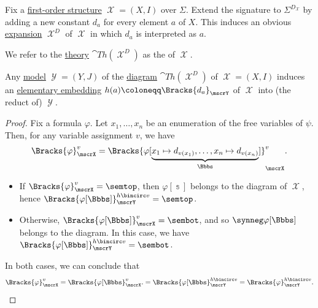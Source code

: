 \begin{definition}\label{def:fol_structure_diagram}
  Fix a \hyperref[def:fol_structure]{first-order structure} \( \mscrX = (X, I) \) over \( \Sigma \). Extend the signature to \( \Sigma^{D_\mscrX} \) by adding a new constant \( d_a \) for every element \( a \) of \( X \). This induces an obvious \hyperref[def:fol_structure_expansion]{expansion} \( \mscrX^D \) of \( \mscrX \) in which \( d_a \) is interpreted as \( a \).

  We refer to the \hyperref[def:fol_theory/model]{theory} \( \cat{Th}(\mscrX^D) \) as the  of \( \mscrX \).
\end{definition}

\begin{proposition}\label{thm:fol_structure_diagram_model}
  Any \hyperref[def:fol_semantics/model]{model} \( \mscrY = (Y, J) \) of the \hyperref[def:fol_structure_diagram]{diagram} \( \cat{Th}(\mscrX^D) \) of \( \mscrX = (X, I) \) induces an \hyperref[def:elementary_embedding]{elementary embedding} \( h(a) \coloneqq \Bracks{d_a}_\mscrY \) of \( \mscrX \) into (the reduct of) \( \mscrY \).
\end{proposition}
\begin{proof}
  Fix a formula \( \varphi \). Let \( x_1, \ldots, x_n \) be an enumeration of the free variables of \( \psi \). Then, for any variable assignment \( v \), we have
  \begin{equation*}
    \Bracks{\varphi}_\mscrX^v
    =
    \Bracks{\varphi[\underbrace{x_1 \mapsto d_{v(x_1)}, \ldots, x_n \mapsto d_{v(x_n)}}_\Bbbs]}_\mscrX^v.
  \end{equation*}

  \begin{itemize}
    \item If \( \Bracks{\varphi}_\mscrX^v = \semtop \), then \( \varphi[\Bbbs] \) belongs to the diagram of \( \mscrX \), hence \( \Bracks{\varphi[\Bbbs]}_\mscrY^{h \bincirc v} = \semtop \).

    \item Otherwise, \( \Bracks{\varphi[\Bbbs]}_\mscrX^v = \sembot \), and so \( \synneg \varphi[\Bbbs] \) belongs to the diagram. In this case, we have \( \Bracks{\varphi[\Bbbs]}_\mscrY^{h \bincirc v} = \sembot \).
  \end{itemize}

  In both cases, we can conclude that
  \begin{equation*}
    \Bracks{\varphi}_\mscrX^v
    =
    \Bracks{\varphi[\Bbbs}_\mscrX^v.
    =
    \Bracks{\varphi[\Bbbs}_\mscrY^{h \bincirc v}
    =
    \Bracks{\varphi}_\mscrY^{h \bincirc v}.
  \end{equation*}
\end{proof}

